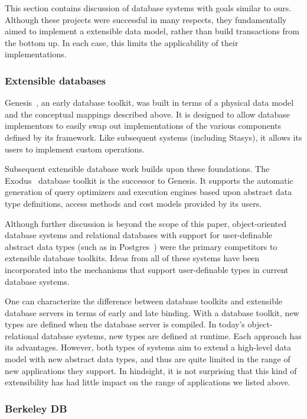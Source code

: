 \documentclass[letterpaper,twocolumn,10pt]{article}
\newcommand{\yad}{Stasys\xspace}
\begin{document}
This section contains discussion of database systems with goals similar to ours.
Although these projects were
successful in many respects, they fundamentally aimed to implement a
extensible data model, rather than build transactions from the bottom up.
In each case, this limits the applicability of their implementations.

\subsubsection{Extensible databases}

Genesis~\cite{genesis}, an early database toolkit, was built in terms
of a physical data model and the conceptual mappings described above.
It is designed to allow database implementors to easily swap out
implementations of the various components defined by its framework.
Like subsequent systems (including \yad), it allows its users to
implement custom operations.

Subsequent extensible database work builds upon these foundations.
The Exodus~\cite{exodus} database toolkit is the successor to
Genesis. It supports the automatic generation of query optimizers and
execution engines based upon abstract data type definitions, access
methods and cost models provided by its users.

Although further discussion is beyond the scope of this paper,
object-oriented database systems and relational databases with
support for user-definable abstract data types (such as in
Postgres~\cite{postgres}) were the primary competitors to extensible
database toolkits.  Ideas from all of these systems have been
incorporated into the mechanisms that support user-definable types in
current database systems.

One can characterize the difference between database toolkits and
extensible database servers in terms of early and late binding.  With
a database toolkit, new types are defined when the database server is
compiled.  In today's object-relational database systems, new types
are defined at runtime.  Each approach has its advantages.  However,
both types of systems aim to extend a high-level data model with new 
abstract data types, and thus are quite limited in the range of new 
applications they support.  In hindsight, it is not surprising that this kind of 
extensibility has had little impact on the range of applications 
we listed above.

\subsubsection{Berkeley DB}
\end{document}
